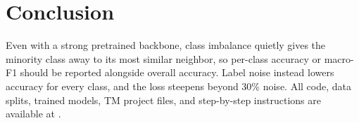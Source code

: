 \section{Conclusion}
\label{sec:conclusion}

Even with a strong pretrained backbone, class imbalance quietly gives the minority class away to its most similar neighbor,
so per-class accuracy or macro-F1 should be reported alongside overall accuracy.
Label noise instead lowers accuracy for every class, and the loss steepens beyond 30\% noise.
All code, data splits, trained models, TM project files, and step-by-step instructions are available at \repo.
